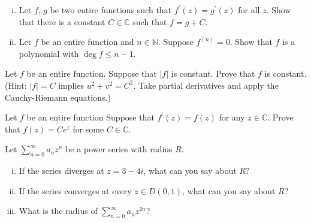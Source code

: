\documentclass{article}
\newcounter{Problem}
\newenvironment{Problem}{\begin{Exercise}[name={Problem},
                                          counter={Problem}]}
                        {\end{Exercise}}
\begin{document}
\begin{Problem}
  \begin{enumerate}[(i)]
    \item{
      Let $f$, $g$ be two entire functions such that
      $f^\prime(z) = g^\prime(z)$ for all $z$. Show that there is a
      constant $C \in \mathbb{C}$ such that $f = g + C$.
    }
    \item{
      Let $f$ be an entire function and $n \in \mathbb{N}$.
      Suppose $f^(n) = 0$. Show that $f$ is a polynomial
      with $\deg f \leq n - 1$.
    }
  \end{enumerate}
\end{Problem}

\begin{Problem}
  Let $f$ be an entire function. Suppose that $|f|$ is constant. Prove
  that $f$ is constant.
  (Hint: $|f| = C$ implies $u^2 + v^2 = C^2$. Take partial derivatives
  and apply the Cauchy-Riemann equations.)
\end{Problem}

\begin{Problem}
  Let $f$ be an entire function Suppose that $f^\prime(z) = f(z)$ for
  any $z \in \mathbb{C}$. Prove that $f(z) = C e^z$ for some
  $C \in \mathbb{C}$.
\end{Problem}

\begin{Problem}
  Let $\sum_{n=0}^\infty a_n z^n$ be a power series with radius $R$.
  \begin{enumerate}[(i)]
    \item{
      If the series diverges at $z = 3 - 4i$, what can you say about $R$?
    }
    \item{
      If the series converges at every $z \in D(0, 1)$, what can you say about
      $R$?
    }
    \item{
      What is the radius of $\sum_{n=0}^\infty a_n z^{2n}$?
    }
  \end{enumerate}
\end{Problem}
\end{document}
